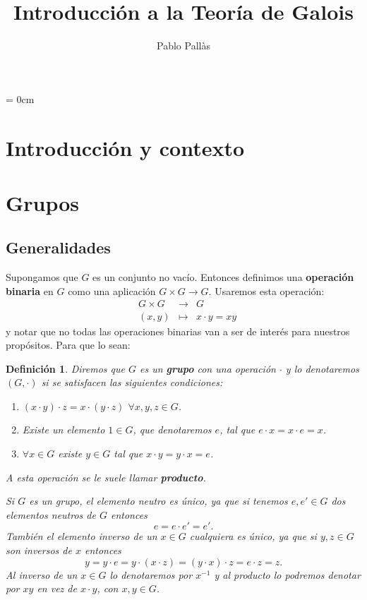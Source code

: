\documentclass[12pt]{article}
\author{Pablo Pallàs}
\title{Introducción a la Teoría de Galois}
\newtheorem{definition}[theorem]{Definición}
\begin{document}
\rmfamily
\maketitle
\tableofcontents
\parindent= 0cm


\section{Introducción y contexto}
\section{Grupos}

\subsection{Generalidades}

Supongamos que $G$ es un conjunto no vacío. Entonces definimos una \textbf{operación binaria} en $G$ como una aplicación $G \times G \longrightarrow G$. Usaremos esta operación:
 $$\begin{array}{rccl}
&G \times G&\longrightarrow &G \\
&(x,y)& \longmapsto &x\cdot y = xy
\end{array}
$$
y notar que no todas las operaciones binarias van a ser de interés para nuestros propósitos. Para que lo sean:

\begin{definition}Diremos que $G$ es un \textbf{grupo} con una operación $\cdot$ y lo denotaremos $(G,\cdot)$ si se satisfacen las siguientes condiciones:
\begin{enumerate}
 \renewcommand{\theenumi}{\roman{enumi}} %
\item $(x\cdot y)\cdot z = x\cdot(y\cdot z)$ $\forall x,y,z \in G$. 
\item Existe un elemento $1 \in G$, que denotaremos $e$, tal que $e\cdot x = x \cdot e = x$.
\item $\forall x \in G$ existe $y \in G$ tal que $x\cdot y = y \cdot x = e$.
\end{enumerate}

A esta operación se le suele llamar \textbf{producto}.

Si $G$ es un grupo, el elemento neutro es único, ya que si tenemos $e,e'\in G$ dos elementos neutros de $G$ entonces $$e=e\cdot e' = e'.$$
También el elemento inverso de un $x\in G$ cualquiera es único, ya que si $y,z \in G$ son inversos de $x$ entonces $$y = y \cdot e = y \cdot (x \cdot z) = (y \cdot x) \cdot z = e \cdot z = z.$$
Al inverso de un $x \in G$ lo denotaremos por $x^{-1}$ y al producto lo podremos denotar por $xy$ en vez de $x \cdot y$, con $x,y \in G$.
\end{definition}
\end{document}
